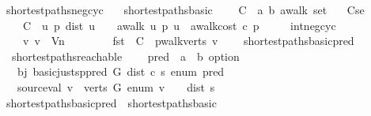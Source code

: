 \begin{isabellebody}
\isanewline
{}\isamarkupfalse%
\ shortest{\isacharunderscore}paths{\isacharunderscore}neg{\isacharunderscore}cyc\ {\isacharequal}\isanewline
\ \ shortest{\isacharunderscore}paths{\isacharunderscore}basic\ {\isacharplus}\isanewline
\ \ \ C\ {\isacharcolon}{\isacharcolon}\ {\isachardoublequoteopen}{\isacharparenleft}{\isacharprime}a\ {\isasymtimes}{\isacharparenleft}{\isacharprime}b\ awalk{\isacharparenright}{\isacharparenright}\ set{\isachardoublequoteclose}\isanewline
\ \ \ C{\isacharunderscore}se{\isacharcolon}\ \isanewline
\ \ \ \ {\isachardoublequoteopen}C\ {\isasymsubseteq}\ {\isacharbraceleft}{\isacharparenleft}u{\isacharcomma}\ p{\isacharparenright}{\isachardot}\ dist\ u\ {\isasymnoteq}\ {\isasyminfinity}\ {\isasymand}\ awalk\ u\ p\ u\ {\isasymand}\ awalk{\isacharunderscore}cost\ c\ p\ {\isacharless}\ {}{\isacharbraceright}{\isachardoublequoteclose}\isanewline
\ \ \ int{\isacharunderscore}neg{\isacharunderscore}cyc{\isacharcolon}\ \isanewline
\ \ \ \ {\isachardoublequoteopen}{\isasymAnd}v{\isachardot}\ v\ {\isasymin}\ V\isactrlsub n\ {\isasymLongrightarrow}\ \isanewline
\ \ \ \ \ \ {\isacharparenleft}fst\ {\isacharbackquote}\ C{\isacharparenright}\ {\isasyminter}\ pwalk{\isacharunderscore}verts\ v\ \ {\isasymnoteq}\ {\isacharbraceleft}{\isacharbraceright}{\isachardoublequoteclose}\isanewline
\isanewline
{}\isamarkupfalse%
\ shortest{\isacharunderscore}paths{\isacharunderscore}basic{\isacharunderscore}pred\ {\isacharequal}\ \isanewline
\ \ shortest{\isacharunderscore}paths{\isacharunderscore}reachable\ {\isacharplus}\isanewline
\ \ \ pred\ {\isacharcolon}{\isacharcolon}\ {\isachardoublequoteopen}{\isacharprime}a\ {\isasymRightarrow}\ {\isacharprime}b\ option{\isachardoublequoteclose}\ \isanewline
\ \ \ bj{\isacharcolon}\ {\isachardoublequoteopen}basic{\isacharunderscore}just{\isacharunderscore}sp{\isacharunderscore}pred\ G\ dist\ c\ s\ enum\ pred{\isachardoublequoteclose}\ \isanewline
\ \ \ source{\isacharunderscore}val{\isacharcolon}\ {\isachardoublequoteopen}{\isacharparenleft}{\isasymexists}v\ {\isasymin}\ verts\ G{\isachardot}\ enum\ v\ {\isasymnoteq}\ {\isasyminfinity}{\isacharparenright}\ {\isasymLongrightarrow}\ dist\ s\ {\isacharequal}\ {}{\isachardoublequoteclose}\isanewline
\isanewline
\isanewline
\isanewline
{}\isamarkupfalse%
\ shortest{\isacharunderscore}paths{\isacharunderscore}basic{\isacharunderscore}pred\ {\isasymsubseteq}\ shortest{\isacharunderscore}paths{\isacharunderscore}basic\isanewline

\end{isabellebody}
